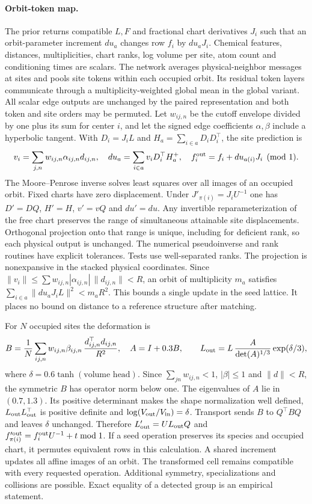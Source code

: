 \paragraph{Orbit-token map.}
The prior returns compatible \(L,F\) and fractional chart derivatives \(J_i\) such that an
orbit-parameter increment \(du_a\) changes row \(f_i\) by \(du_a J_i\).
Chemical features, distances, multiplicities, chart ranks, log volume per site, atom count and
conditioning times are scalars. The network averages physical-neighbor messages at sites and
pools site tokens within each occupied orbit. Its residual token layers communicate through a
multiplicity-weighted global mean in the global variant. All scalar edge outputs are unchanged by
the paired representation and both token and site orders may be permuted. Let \(w_{ij,n}\) be
the cutoff envelope divided by one plus its sum for center \(i\), and let the signed edge
coefficients \(\alpha,\beta\) include a hyperbolic tangent. With \(D_i=J_iL\) and
\(H_a=\sum_{i\in a}D_iD_i^\top\), the site prediction is
\[
 v_i=\sum_{j,n}w_{ij,n}\alpha_{ij,n}d_{ij,n},\quad
 du_a=\sum_{i\in a}v_iD_i^\top H_a^+,\quad
 f_i^{\rm out}=f_i+du_{a(i)}J_i\pmod1 .
\]
The Moore--Penrose inverse solves least squares over all images of an occupied orbit. Fixed charts
have zero displacement. Under \(J'_{\pi(i)}=J_iU^{-1}\) one has \(D'=DQ\), \(H'=H\),
\(v'=vQ\) and \(du'=du\). Any invertible reparameterization of the free chart preserves the
range of simultaneous attainable site displacements. Orthogonal projection onto that range is
unique, including for deficient rank, so each physical output is unchanged. The numerical
pseudoinverse and rank routines have explicit tolerances. Tests use well-separated ranks.
The projection is nonexpansive in the stacked physical coordinates. Since
\(\|v_i\|\leq\sum w_{ij,n}|\alpha_{ij,n}|\,\|d_{ij,n}\|<R\), an orbit of multiplicity \(m_a\)
satisfies \(\sum_{i\in a}\|du_aJ_iL\|^2<m_a R^2\). This bounds a single update in the
seed lattice. It places no bound on distance to a reference structure after matching.

For \(N\) occupied sites the deformation is
\[
 B=\frac{1}{N}\sum_{ij,n}w_{ij,n}\beta_{ij,n}\,\frac{d_{ij,n}^\top d_{ij,n}}{R^2},
 \quad A=I+0.3 B,\qquad
 L_{\rm out}= L\,\frac{A}{\det(A)^{1/3}}\exp(\delta/3),
\]
where \(\delta=0.6\tanh(\text{volume head})\). Since \(\sum_{jn}w_{ij,n}<1\),
\(|\beta|\leq1\) and \(\|d\|<R\), the symmetric \(B\) has operator norm below one.
The eigenvalues of \(A\) lie in \((0.7,1.3)\). Its positive determinant makes the shape
normalization well defined, \(L_{\rm out}L_{\rm out}^\top\) is positive definite and
\(\log(V_{\rm out}/V_{\rm in})=\delta\).
Transport sends \(B\) to \(Q^\top BQ\) and leaves \(\delta\) unchanged. Therefore
\(L'_{\rm out}=U L_{\rm out}Q\) and \(f'^{\rm out}_{\pi(i)}=f_i^{\rm out}U^{-1}+t\bmod1\).
If a seed operation preserves its species and occupied chart, it permutes equivalent rows in this
calculation. A shared increment updates all affine images of an orbit. The transformed cell
remains compatible with every requested operation. Additional symmetry, specializations and
collisions are possible. Exact equality of a detected group is an empirical statement.

